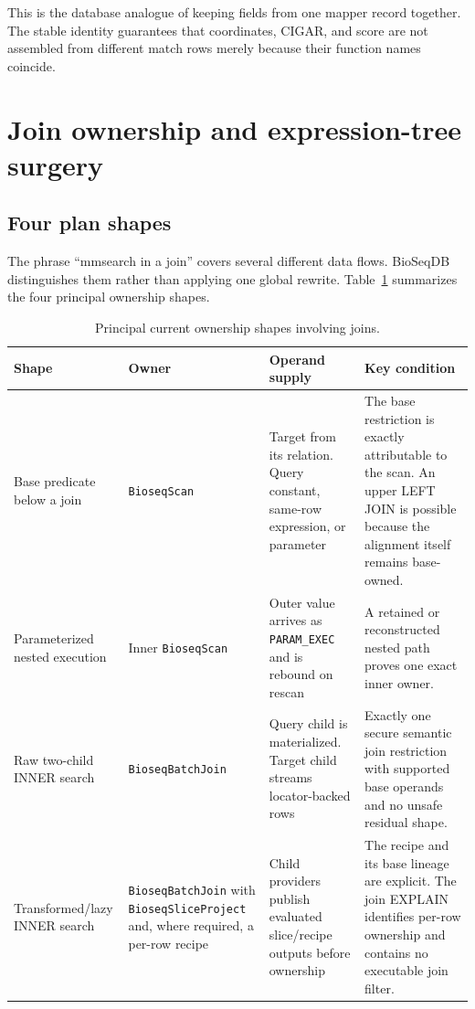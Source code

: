 This is the database analogue of keeping fields from one mapper record
together.  The stable identity guarantees that coordinates, CIGAR, and score
are not assembled from different match rows merely because their function
names coincide.

\section{Join ownership and expression-tree surgery}
\label{sec:mmsearch-join-ownership}

\subsection{Four plan shapes}

The phrase ``mmsearch in a join'' covers several different data flows.
BioSeqDB distinguishes them rather than applying one global rewrite.
Table~\ref{tab:mmsearch-join-shapes} summarizes the four principal ownership
shapes.

\begin{table}[htbp]
\centering
\scriptsize
\caption{Principal current ownership shapes involving joins.}
\label{tab:mmsearch-join-shapes}
\begin{tabular}{@{}p{}p{}p{}p{}@{}}
\toprule
Shape & Owner & Operand supply & Key condition \\
\midrule
Base predicate below a join &
\texttt{BioseqScan} &
Target from its relation.  Query constant, same-row expression, or parameter &
The base restriction is exactly attributable to the scan.  An upper LEFT
JOIN is possible because the alignment itself remains base-owned. \\
Parameterized nested execution &
Inner \texttt{BioseqScan} &
Outer value arrives as \texttt{PARAM\_EXEC} and is rebound on rescan &
A retained or reconstructed nested path proves one exact inner owner. \\
Raw two-child INNER search &
\texttt{BioseqBatchJoin} &
Query child is materialized.  Target child streams locator-backed rows &
Exactly one secure semantic join restriction with supported base operands
and no unsafe residual shape. \\
Transformed/lazy INNER search &
\texttt{BioseqBatchJoin} with
\texttt{BioseqSliceProject} and, where required, a per-row recipe &
Child providers publish evaluated slice/recipe outputs before ownership &
The recipe and its base lineage are explicit.  The join EXPLAIN identifies
per-row ownership and contains no executable join filter. \\
\bottomrule
\end{tabular}
\end{table}

